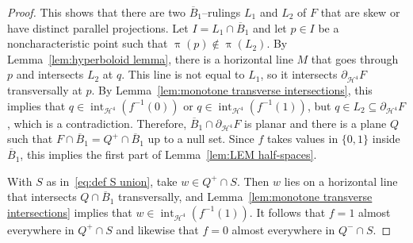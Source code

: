 \documentclass[11pt,reqno]{amsart}
\newcommand{\cH}{\mathcal{H}}
\newcommand{\0}{\mathbf{0}}
\renewcommand{\1}{\mathbf 1}
\renewcommand{\subset}{\subseteq}
\theoremstyle{remark}
\DeclareMathOperator{\inter}{int}
\begin{document}
\begin{proof}
  This shows that there are two $\overline{B}_1$--rulings $L_1$ and $L_2$ of $F$ that are skew or have distinct parallel projections.  Let $I=L_1\cap \overline{B}_1$ and let $p\in I$ be a noncharacteristic point such that $\uppi(p)\not \in \uppi(L_2)$.  By Lemma~\ref{lem:hyperboloid lemma}, there is a horizontal line $M$ that goes through $p$ and intersects $L_2$ at $q$.  This line is not equal to $L_1$, so it intersects $\partial_{\cH^4} F$ transversally at $p$.  By Lemma~\ref{lem:monotone transverse intersections}, this implies that $q\in \inter_{\cH^4} (f^{-1}(0))$ or $q\in \inter_{\cH^4} (f^{-1}(1))$, but $q\in L_2\subset \partial_{\cH^4} F$, which is a contradiction.  Therefore, $\overline{B}_1\cap \partial_{\cH^4} F$ is planar and there is a plane $Q$ such that $F\cap \overline{B}_1=Q^+\cap \overline{B}_1$ up to a null set.  Since $f$ takes values in $\{0,1\}$ inside  $\overline{B}_1$, this implies the first part of Lemma~\ref{lem:LEM half-spaces}.

  With $S$ as in~\eqref{eq:def S union}, take $w\in Q^+\cap S$.  Then $w$ lies on a horizontal line that intersects $Q\cap \overline{B}_1$ transversally, and Lemma~\ref{lem:monotone transverse intersections} implies that $w\in \inter_{\cH^4} (f^{-1}(1))$.  It follows that $f=1$ almost everywhere in $Q^+\cap S$ and likewise that $f=0$ almost everywhere in $Q^-\cap S$.
\end{proof}
\end{document}
